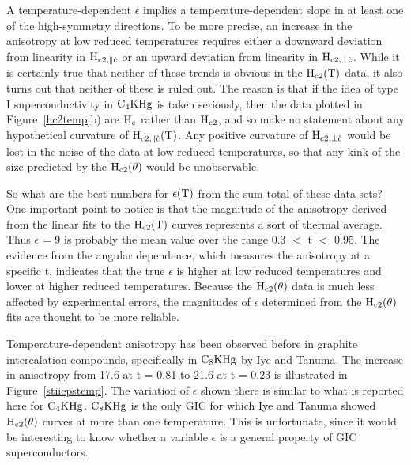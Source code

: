         A  temperature-dependent $\epsilon$ implies a temperature-dependent
slope in at least one of the high-symmetry directions.  To be more precise,
an increase in the anisotropy at low reduced temperatures requires either a
downward deviation from linearity in $\rm H_{c2, \parallel \hat{c}}$  or an
upward deviation from linearity  in $\rm  H_{c2, \perp \hat{c}}$.  While it
is  certainly true that  neither  of these trends   is obvious in  the $\rm
H_{c2}(T)$ data, it also turns out that neither of these is ruled out.  The
reason is that  if the idea of type  I superconductivity in $\rm C_4KHg$ is
taken  seriously, then the  data  plotted in  Figure~\ref{hc2temp}b) are $\rm
H_c$  rather than  $\rm  H_{c2}$,  and   so make  no   statement  about any
hypothetical  curvature    of $\rm H_{c2,    \parallel   \hat{c}}(T)$.  Any
positive curvature of $\rm  H_{c2,  \perp  \hat{c}}$ would  be
lost in the noise of the data at low reduced temperatures, so that any kink
of the size predicted by the $\rm H_{c2}(\theta)$ would be unobservable.

        So what  are the best numbers  for  $\rm  \epsilon(T)$ from the sum
total of these  data  sets?  One  important   point to notice  is that  the
magnitude of the   anisotropy derived from the  linear  fits to  the   $\rm
H_{c2}(T)$ curves represents a sort of thermal average.  Thus  $\epsilon$ =
9 is probably  the mean value  over the range 0.3 $<$  t $<$   0.95.    The
evidence from  the angular dependence, which  measures the anisotropy  at a
specific  t, indicates  that the true $\epsilon$  is  higher at low reduced
temperatures and lower at  higher  reduced  temperatures.  Because the $\rm
H_{c2}(\theta)$ data is  much  less affected by  experimental  errors,  the
magnitudes of $\epsilon$ determined from the $\rm  H_{c2}(\theta)$ fits are
thought to be more reliable.

        Temperature-dependent   anisotropy has  been   observed  before  in
graphite intercalation compounds, specifically in  $\rm C_8KHg$ by  Iye and
Tanuma.  The increase in anisotropy from 17.6  at t = 0.81  to  21.6 at t =
0.23 is illustrated in Figure~\ref{stiiepstemp}.  The variation of $\epsilon$
shown there  is similar to  what is reported here  for $\rm C_4KHg$.   $\rm
C_8KHg$  is   the   only GIC  for  which    Iye and   Tanuma   showed  $\rm
H_{c2}(\theta)$ curves at more than one temperature.   This is unfortunate,
since it would be  interesting to  know whether a  variable $\epsilon$ is a
general property of GIC superconductors.

